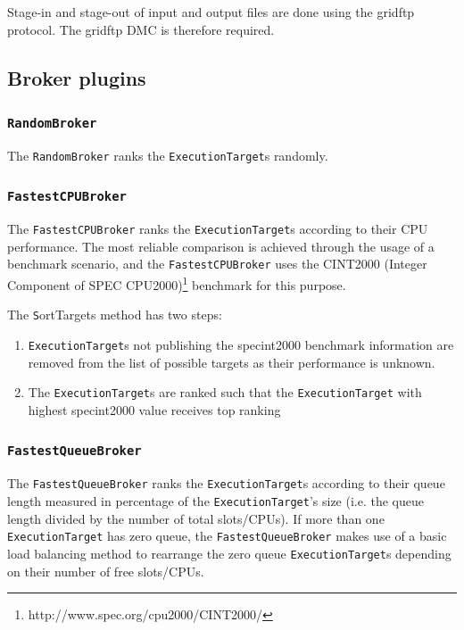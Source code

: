\documentclass{book}
\newcommand{\RandomBroker}{\texttt{RandomBroker}}
\newcommand{\FastestCPUBroker}{\texttt{FastestCPUBroker}}
\newcommand{\FastestQueueBroker}{\texttt{FastestQueueBroker}}
\newcommand{\ExecutionTarget}{\texttt{ExecutionTarget}}
\begin{document}
Stage-in and stage-out of input and output files are done using the
gridftp protocol. The gridftp DMC is therefore required.

\subsection{Broker plugins}
\label{sec:brokerplugins}

\subsubsection{\RandomBroker}

The {\RandomBroker} ranks the {\ExecutionTarget}s randomly. 

\subsubsection{\FastestCPUBroker}

The {\FastestCPUBroker} ranks the {\ExecutionTarget}s according to their CPU performance. The most 
reliable comparison is achieved through the usage of a benchmark scenario, and the {\FastestCPUBroker}
uses the CINT2000 (Integer Component of SPEC CPU2000)\footnote{http://www.spec.org/cpu2000/CINT2000/} 
benchmark for this purpose. 

The {\texttt SortTargets} method has two steps:

\begin{enumerate}
\item{{\ExecutionTarget}s not publishing the specint2000 benchmark information are removed from the list 
  of possible targets as their performance is unknown.}
\item{The {\ExecutionTarget}s are ranked such that the {\ExecutionTarget} with highest specint2000 value 
  receives top ranking}
\end{enumerate}

\subsubsection{\FastestQueueBroker}

The {\FastestQueueBroker} ranks the {\ExecutionTarget}s according to their queue length measured in percentage 
of the {\ExecutionTarget}'s size (i.e. the queue length divided by the number of total slots/CPUs). If more 
than one {\ExecutionTarget} has zero queue, the {\FastestQueueBroker} makes use of a basic load balancing method 
to rearrange the zero queue {\ExecutionTarget}s depending on their number of free slots/CPUs. 
\end{document}
